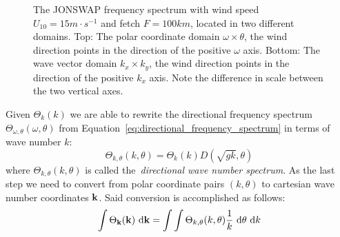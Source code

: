 %
\begin{figure}
\centering
\subbottom
{
\label{sfig:polar}
}
\subbottom
{
\label{sfig:wave_vector}
}
\caption{The JONSWAP frequency spectrum with wind speed $U_{10} = 15m\cdot 
s^{-1}$ and fetch $F = 100km$, located in two different domains. Top: The polar
coordinate domain $\omega \times \theta$, the wind direction points in the
direction of the positive $\omega$ axis. Bottom: The wave vector domain
$k_x \times k_y$, the wind direction points in the direction of the positive
$k_x$ axis. Note the difference in scale between the two vertical axes.}
\label{fig:jonswap_3d_omega_theta_kx_ky}
\end{figure}
%
Given $\Theta_k(k)$ we are able to rewrite the directional frequency spectrum
$\Theta_{\omega, \theta}(\omega, \theta)$ from
Equation~\ref{eq:directional_frequency_spectrum} in terms of wave number $k$:
%
\begin{equation}
\label{eq:theta_k_polar}
 \Theta_{k,\theta}(k,\theta) = \Theta_k(k)D(\sqrt{gk},\theta)
\end{equation}
%
where $\Theta_{k,\theta}(k,\theta)$ is called the~\emph{directional wave number 
spectrum}. As the last step we need to convert from polar coordinate pairs 
$(k,\theta)$ to cartesian wave number coordinates $\mathbf{k}$. Said conversion 
is accomplished as follows:
%
\begin{equation}
\label{eq:theta_cart_to_polar}
\int\Theta_{\mathbf{k}}(\mathbf{k})~\mathrm{d}\mathbf{k} = 
\int\int\Theta_{k,\theta}(k,\theta)\frac{1}{k}~\mathrm{d}\theta~\mathrm{d}k
\end{equation}
